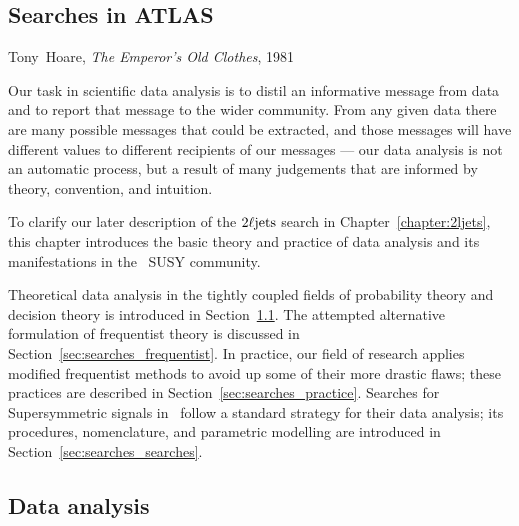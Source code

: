 \begin{singlespacing}
\chapter{Searches in ATLAS}
\label{chapter:searches}
%
\begin{epigraphs}
%
{Tony~Hoare,
\textit{The Emperor’s Old Clothes},
1981~\cite{hoare2007emperor}}
\end{epigraphs}
\end{singlespacing}

Our task in scientific data analysis is to distil an informative
message from data and to report that message to the wider community.
From any given data there are many possible messages that could be extracted,
and those messages will have different values to different recipients of our
messages --- our data analysis is not an automatic process, but a result
of many judgements that are informed by theory, convention, and intuition.

To clarify our later description of the $2\ell\mathrm{jets}$ search in
Chapter~\ref{chapter:2ljets}, this chapter introduces the basic theory and
practice of data analysis and its manifestations in the \atlas\ SUSY community.

Theoretical data analysis in the tightly coupled fields of probability theory
and decision theory is introduced in Section~\ref{sec:searces_data_analysis}.
The attempted alternative formulation of frequentist theory is discussed in
Section~\ref{sec:searches_frequentist}.
In practice, our field of research applies modified frequentist methods to
avoid up some of their more drastic flaws; these practices are
described in Section~\ref{sec:searches_practice}.
Searches for Supersymmetric signals in \atlas\ follow a standard strategy for
their data analysis; its procedures, nomenclature, and parametric modelling
are introduced in Section~\ref{sec:searches_searches}.


\section{Data analysis}
\label{sec:searces_data_analysis}

